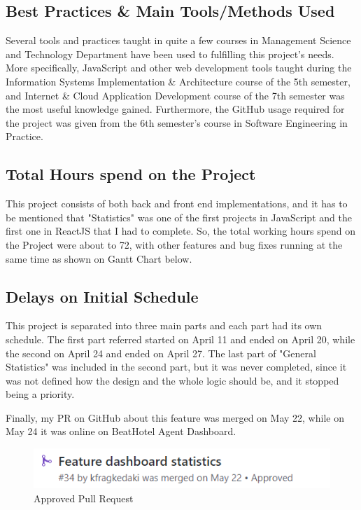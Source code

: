 \subsection{Best Practices \& Main Tools/Methods Used}

Several tools and practices taught in quite a few courses in Management Science and Technology Department have been used to fulfilling this project's needs. More specifically, JavaScript and other web development tools taught during the Information Systems Implementation \& Architecture course of the 5th semester, and Internet \& Cloud Application Development course of the 7th semester was the most useful knowledge gained. Furthermore, the GitHub usage required for the project was given from the 6th semester's course in Software Engineering in Practice. \par

\subsection{Total Hours spend on the Project}

This project consists of both back and front end implementations, and it has to be mentioned that "Statistics" was one of the first projects in JavaScript and the first one in ReactJS that I had to complete. So, the total working hours spend on the Project were about to 72, with other features and bug fixes running at the same time as shown on Gantt Chart below. \par

\subsection{Delays on Initial Schedule}

This project is separated into three main parts and each part had its own schedule. The first part referred started on April 11 and ended on April 20, while the second on April 24 and ended on April 27. The last part of "General Statistics" was included in the second part, but it was never completed, since it was not defined how the design and the whole logic should be, and it stopped being a priority. \par

Finally, my PR on GitHub about this feature was merged on May 22, while on May 24 it was online on BeatHotel Agent Dashboard.

\begin{figure}[H]
	\begin{center}
		\includegraphics[scale=0.85]{images/my_projects/Statistics/feature-dashboard-statistics-PR.png}
	\end{center}
	\caption{Approved Pull Request}
\end{figure}

